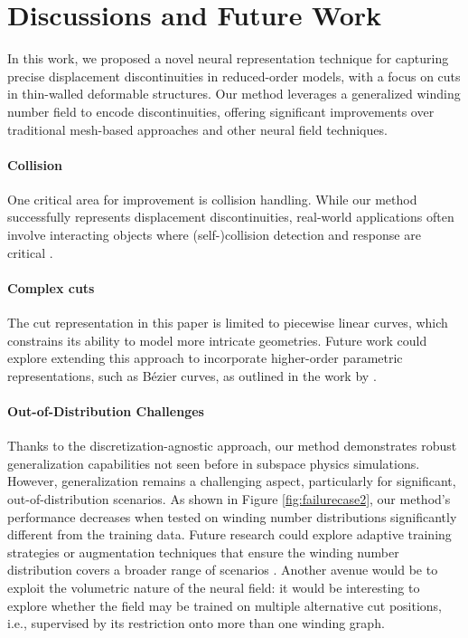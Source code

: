 \section{Discussions and Future Work}
In this work, we proposed a novel neural representation technique for capturing precise displacement discontinuities in reduced-order models, with a focus on cuts in thin-walled deformable structures. Our method leverages a generalized winding number field to encode discontinuities, offering significant improvements over traditional mesh-based approaches and other neural field techniques.

\paragraph{Collision} One critical area for improvement is collision handling. While our method successfully represents displacement discontinuities, real-world applications often involve interacting objects where (self-)collision detection and response are critical \cite{zesch2023neural}.

\paragraph{Complex cuts} The cut representation in this paper is limited to piecewise linear curves, which constrains its ability to model more intricate geometries. Future work could explore extending this approach to incorporate higher-order parametric representations, such as Bézier curves, as outlined in the work by \citet{Spainhour2024_arxiv}.

\paragraph{Out-of-Distribution Challenges} Thanks to the discretization-agnostic approach, our method demonstrates robust generalization capabilities not seen before in subspace physics simulations. However, generalization remains a challenging aspect, particularly for significant, out-of-distribution scenarios. As shown in Figure \ref{fig:failurecase2}, our method's performance decreases when tested on winding number distributions significantly different from the training data. Future research could explore adaptive training strategies or augmentation techniques that ensure the winding number distribution covers a broader range of scenarios \cite{grangier2023adaptive}. Another avenue would be to exploit the volumetric nature of the neural field: it would be interesting to explore whether the field may be trained on multiple alternative cut positions, i.e., supervised by its restriction onto more than one winding graph.



